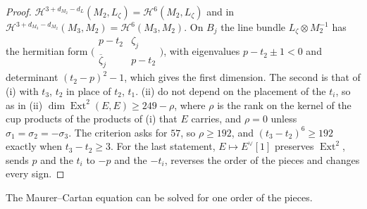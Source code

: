 \documentclass[11pt,reqno]{amsart}
\theoremstyle{plain}
\theoremstyle{definition}
\theoremstyle{remark}
\newcommand{\cH}{\mathcal{H}}
\DeclareMathOperator{\Ext}{Ext}
\newcommand{\bbar}[1]{\overline{#1}}
\begin{document}
\begin{proof}
$\cH^{3+d_{M_{2}}-d_{L}}(M_{2},L_{\zeta})=\cH^{6}(M_{2},L_{\zeta})$ and in
$\cH^{3+d_{M_{3}}-d_{M_{2}}}(M_{3},M_{2})=\cH^{6}(M_{3},M_{2})$. On $B_{j}$
the line bundle $L_{\zeta}\otimes M_{2}^{-1}$ has the hermitian form
$\bigl(\begin{smallmatrix}p-t_{2}&\zeta_{j}\\ \bbar\zeta_{j}&p-t_{2}
\end{smallmatrix}\bigr)$, with eigenvalues $p-t_{2}\pm1<0$ and determinant
$(t_{2}-p)^{2}-1$, which gives the first dimension. The second is that of
(i) with $t_{3}$, $t_{2}$ in place of $t_{2}$,
$t_{1}$.
(ii)  do not depend on the
placement of the $t_{i}$, so as in (ii)
$\dim\Ext^{2}(E,E)\ge249-\rho$, where $\rho$ is the rank on the kernel of
the cup products of the products of (i) that $E$ carries, and $\rho=0$
unless $\sigma_{1}=\sigma_{2}=-\sigma_{3}$. The criterion asks for $57$,
so $\rho\ge192$, and $(t_{3}-t_{2})^{6}\ge192$ exactly when
$t_{3}-t_{2}\ge3$. For the last statement, $E\mapsto E^{\vee}[1]$ preserves
$\Ext^{2}$, sends $p$ and the $t_{i}$ to $-p$ and the $-t_{i}$, reverses the
order of the pieces and changes every sign.
\end{proof}

The Maurer--Cartan equation can be solved for one order of the pieces.
\end{document}
